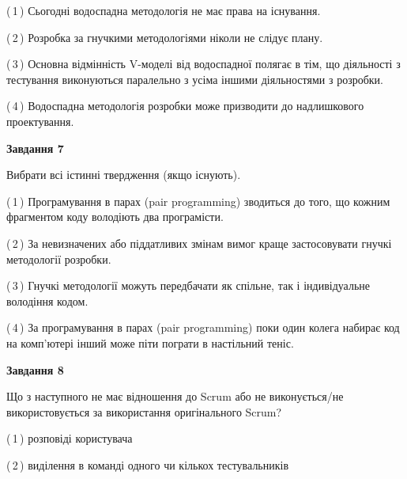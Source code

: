\documentclass[10pt, ukrainian]{article}
\begin{document}
{\begin {large}
(\,1\,) Сьогодні водоспадна методологія не має права на існування. %



(\,2\,) Розробка за гнучкими методологіями ніколи не слідує плану. %



(\,3\,) Основна відмінність V-моделі від водоспадної полягає в тім, що діяльності з тестування виконуються паралельно з усіма іншими діяльностями з розробки. %



(\,4\,) Водоспадна методологія розробки може призводити до надлишкового проектування. %


{\begin {center}\textbf{Завдання 7}\end {center}}\par
Вибрати всі істинні твердження (якщо існують).\par
\vspace{2mm}



(\,1\,) Програмування в парах (pair programming) зводиться до того, що кожним фрагментом коду володіють два програмісти. %



(\,2\,) За невизначених або піддатливих змінам вимог краще застосовувати гнучкі методології розробки. %



(\,3\,) Гнучкі методології можуть передбачати як спільне, так і індивідуальне володіння кодом. %



(\,4\,) За програмування в парах (pair programming) поки один колега набирає код на комп'ютері інший може піти пограти в настільний теніс. %


{\begin {center}\textbf{Завдання 8}\end {center}}\par
Що з наступного не має відношення до Scrum або не виконується/не використовується за використання оригінального Scrum?\par
\vspace{2mm}



(\,1\,) розповіді користувача%



(\,2\,) виділення в команді одного чи кількох тестувальників%




\end{large}}
\end{document}
